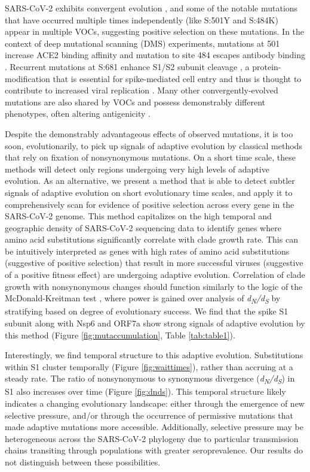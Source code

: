 \documentclass[11pt,oneside,letterpaper]{article}
\begin{document}
SARS-CoV-2 exhibits convergent evolution \cite{Van_Dorp2020-ox, Martin2021-lj, Rochman2021-sv}, and some of the notable mutations that have occurred multiple times independently (like S:501Y and S:484K) appear in multiple VOCs, suggesting positive selection on these mutations.
In the context of deep mutational scanning (DMS) experiments, mutations at 501 increase ACE2 binding affinity \cite{Starr2020-bt} and mutation to site 484 escapes antibody binding \cite{Greaney2021-jn}.
Recurrent mutations at S:681 enhance S1/S2 subunit cleavage \cite{Lubinski2021-ul, Liu2021-ne}, a protein-modification that is essential for spike-mediated cell entry \cite{Hoffmann2020-vi} and thus is thought to contribute to increased viral replication \cite{Liu2021-ne}.
Many other convergently-evolved mutations are also shared by VOCs and possess demonstrably different phenotypes, often altering antigenicity \cite{Li2020-jd, McCarthy2021-lg, Wang2021-dm}.

Despite the demonstrably advantageous effects of observed mutations, it is too soon, evolutionarily, to pick up signals of adaptive evolution by classical methods that rely on fixation of nonsynonymous mutations.
On a short time scale, these methods will detect only regions undergoing very high levels of adaptive evolution.
As an alternative, we present a method that is able to detect subtler signals of adaptive evolution on short evolutionary time scales, and apply it to comprehensively scan for evidence of positive selection across every gene in the SARS-CoV-2 genome.
This method capitalizes on the high temporal and geographic density of SARS-CoV-2 sequencing data to identify genes where amino acid substitutions significantly correlate with clade growth rate.
This can be intuitively interpreted as genes with high rates of amino acid substitutions (suggestive of positive selection) that result in more successful viruses (suggestive of a positive fitness effect) are undergoing adaptive evolution.
Correlation of clade growth with nonsynonymous changes should function similarly to the logic of the McDonald-Kreitman test \cite{mcdonald1991adaptive}, where power is gained over analysis of \emph{d\textsubscript{N}/d\textsubscript{S}} by stratifying based on degree of evolutionary success.
We find that the spike S1 subunit along with Nsp6 and ORF7a show strong signals of adaptive evolution by this method (Figure \ref{fig:mutaccumulation}, Table \ref{tab:table1}).

Interestingly, we find temporal structure to this adaptive evolution. Substitutions within S1 cluster temporally (Figure \ref{fig:waittimes}), rather than accruing at a steady rate.
The ratio of nonsynonymous to synonymous divergence (\emph{d\textsubscript{N}/d\textsubscript{S}}) in S1 also increases over time (Figure \ref{fig:dnds}).
This temporal structure likely indicates a changing evolutionary landscape: either through the emergence of new selective pressure, and/or through the occurrence of permissive mutations that made adaptive mutations more accessible.
Additionally, selective pressure may be heterogeneous across the SARS-CoV-2 phylogeny due to particular transmission chains transiting through populations with greater seroprevalence. Our results do not distinguish between these possibilities.
\end{document}
